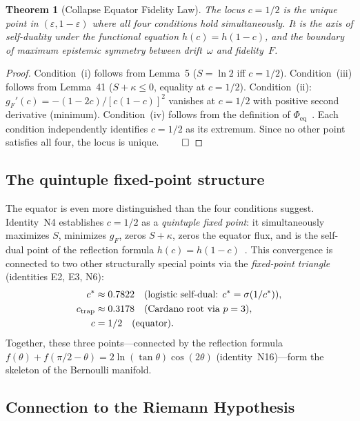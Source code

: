 \documentclass[
  aps,
  prd,
  twocolumn,
  superscriptaddress,
  nofootinbib,
  floatfix
]{revtex4-2}
\newtheorem{theorem}{Theorem}
\newcommand{\eps}{\varepsilon}
\newcommand{\gF}{g_{\!F}}
\begin{document}
\begin{theorem}[Collapse Equator Fidelity Law]\label{thm:equator}
The locus $c = 1/2$ is the unique point in $(\eps, 1{-}\eps)$ where
all four conditions hold simultaneously.  It is the axis of
self-duality under the functional equation $h(c) = h(1{-}c)$, and the
boundary of maximum epistemic symmetry between drift~$\omega$ and
fidelity~$F$.
\end{theorem}

\begin{proof}
Condition~(i) follows from Lemma~5 ($S = \ln 2$ iff $c = 1/2$).
Condition~(iii) follows from Lemma~41 ($S + \kappa \leq 0$, equality
at $c = 1/2$).  Condition~(ii): $\gF'(c) = -(1-2c)/[c(1-c)]^2$
vanishes at $c = 1/2$ with positive second derivative (minimum).
Condition~(iv) follows from the definition of
$\Phi_{\mathrm{eq}}$~\cite{paulus2025equator}.  Each condition
independently identifies $c = 1/2$ as its extremum.  Since no other
point satisfies all four, the locus is unique. $\qed$
\end{proof}

\subsection{The quintuple fixed-point structure}

The equator is even more distinguished than the four conditions
suggest.  Identity~N4 establishes $c = 1/2$ as a \emph{quintuple
fixed point}: it simultaneously maximizes $S$, minimizes $\gF$,
zeros $S + \kappa$, zeros the equator flux, and is the self-dual
point of the reflection formula $h(c) = h(1 - c)$~\cite{umcpmetadatarepo}.
This convergence is connected to two other structurally special
points via the \emph{fixed-point triangle} (identities E2, E3, N6):
\begin{align}
  c^* &\approx 0.7822 \quad\text{(logistic self-dual: $c^* = \sigma(1/c^*)$)}, \notag\\
  c_{\mathrm{trap}} &\approx 0.3178 \quad\text{(Cardano root via $p = 3$)}, \\
  c &= 1/2 \quad\text{(equator)}. \notag
\end{align}
Together, these three points---connected by the reflection formula
$f(\theta) + f(\pi/2 - \theta) = 2\ln(\tan\theta)\cos(2\theta)$
(identity~N16)---form the skeleton of the Bernoulli manifold.

\subsection{Connection to the Riemann Hypothesis}
\end{document}
